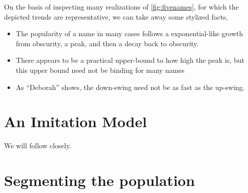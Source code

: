 \documentclass[a4paper]{article}
\begin{document}
On the basis of inspecting many realizations of \cref{fig:fivenames}, for which
the depicted trends are representative, we can take away some stylized facts,

\begin{itemize}
\item The popularity of a name in many cases follows a exponential-like growth
from obscurity, a peak, and then a decay back to obscurity.
\item There appears to be a practical upper-bound to how high the peak is, but
this upper bound need not be binding for many names
\item As ``Deborah'' shows, the down-swing need not be as fast as the up-swing.
\end{itemize}

\section{An Imitation Model}

We will follow \cite{hahn2003drift} closely.

\section{Segmenting the population}



\end{document}
